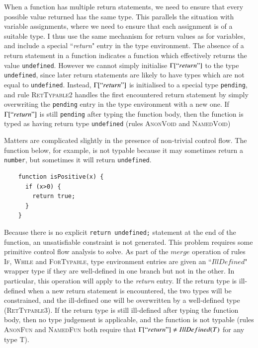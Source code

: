 \documentclass[12pt,a4paper,twoside,openright]{report}
\theoremstyle{definition}
\theoremstyle{dotless}
\newcommand*{\js}{\texttt}
\begin{document}
When a function has multiple return statements, we need to ensure that every
possible value returned has the same type.  This parallels the situation with
variable assignments, where we need to ensure that each assignment is of a
suitable type. I thus use the same mechanism for return values as for
variables, and include a special ``\textit{return}" entry in the type
environment. The absence of a return statement in a function indicates a
function which effectively returns the value \js{undefined}.  However we cannot
simply initialise $\Gamma[``return"]$ to the type \texttt{undefined}, since
later return statements are likely to have types which are not equal to
\texttt{undefined}. Instead, $\Gamma[``return"]$ is initialised to a special
type \texttt{pending}, and rule \textsc{RetTypable2} handles the first
encountered return statement by simply overwriting the \texttt{pending} entry
in the type environment with a new one. If $\Gamma[``return"]$ is still
\texttt{pending} after typing the function body, then the function is typed as
having return type \texttt{undefined} (rules \textsc{AnonVoid} and
\textsc{NamedVoid})

Matters are complicated slightly in the presence of non-trivial control flow.
The function below, for example, is not typable because it may sometimes return
a \texttt{number}, but sometimes it will return \texttt{undefined}.
\begin{program}[H]
  \begin{verbatim}
	function isPositive(x) {
	  if (x>0) {
		return true;
	  }
	}
  \end{verbatim}
\end{program}

Because there is no explicit \js{return undefined;} statement at the end of the
function, an unsatisfiable constraint is not generated. This problem requires
some primitive control flow analysis to solve. As part of the $merge$ operation
of rules \textsc{If}, \textsc{While} and \textsc{ForTypable}, type environment
entries are given an ``$IllDefined$" wrapper type if they are well-defined in
one branch but not in the other. In particular, this operation will apply to
the \textit{return} entry. If the return type is ill-defined when a new return
statement is encountered, the two types will be constrained, and the
ill-defined one will be overwritten by a well-defined type
(\textsc{RetTypable3}).  If the return type is still ill-defined after typing
the function body, then no type judgement is applicable, and the function is
not typable (rules \textsc{AnonFun} and \textsc{NamedFun} both require that
$\Gamma[``return"]\neq IllDefined(T)$ for any type T).
\end{document}
